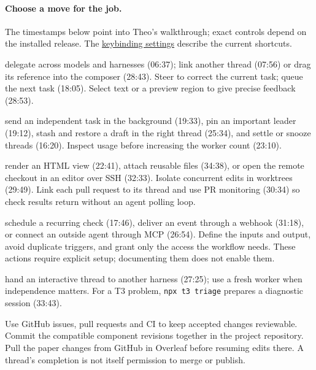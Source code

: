 \paragraph{Choose a move for the job.} The timestamps below point into Theo's walkthrough; exact controls depend on the installed release. The \href{https://github.com/pingdotgg/t3code/blob/main/docs/user/keybindings.md}{keybinding settings} describe the current shortcuts.
\begin{description}[noitemsep]
  \item[Direct the work:] delegate across models and harnesses (06:37); link another thread (07:56) or drag its reference into the composer (28:43). Steer to correct the current task; queue the next task (18:05). Select text or a preview region to give precise feedback (28:53).
  \item[Manage attention:] send an independent task in the background (19:33), pin an important leader (19:12), stash and restore a draft in the right thread (25:34), and settle or snooze threads (16:20). Inspect usage before increasing the worker count (23:10).
  \item[Inspect and deliver:] render an HTML view (22:41), attach reusable files (34:38), or open the remote checkout in an editor over SSH (32:33). Isolate concurrent edits in worktrees (29:49). Link each pull request to its thread and use PR monitoring (30:34) so check results return without an agent polling loop.
  \item[Trigger bounded work:] schedule a recurring check (17:46), deliver an event through a webhook (31:18), or connect an outside agent through MCP (26:54). Define the inputs and output, avoid duplicate triggers, and grant only the access the workflow needs. These actions require explicit setup; documenting them does not enable them.
  \item[Change perspective or diagnose:] hand an interactive thread to another harness (27:25); use a fresh worker when independence matters. For a T3 problem, \texttt{npx t3 triage} prepares a diagnostic session (33:43).
\end{description}
Use GitHub issues, pull requests and CI to keep accepted changes reviewable. Commit the compatible component revisions together in the project repository. Pull the paper changes from GitHub in Overleaf before resuming edits there. A thread's completion is not itself permission to merge or publish.
